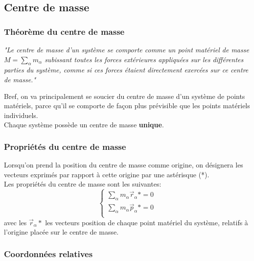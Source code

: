 \documentclass{article}
\numberwithin{equation}{section}
\begin{document}
\subsection{Centre de masse}

\subsubsection{Théorème du centre de masse}
\begin{center}
	\emph{"Le centre de masse d'un système se comporte comme un point matériel de masse \(M = \sum_\alpha m_\alpha\) subissant toutes les forces extérieures appliquées sur les différentes parties du système, comme si ces forces étaient directement exercées sur ce centre de masse."}
\end{center}
Bref, on va principalement se soucier du centre de masse d'un système de points matériels, parce qu'il se comporte de façon plus prévisible que les points matériels individuels. \\
Chaque système possède un centre de masse \textbf{unique}.

\subsubsection{Propriétés du centre de masse}
Lorsqu'on prend la position du centre de masse comme origine, on désignera les vecteurs exprimés par rapport à cette origine par une astérisque (*). \\

Les propriétés du centre de masse sont les suivantes:
\begin{equation}
	\begin{cases}
		\sum_\alpha m_\alpha \vec r_\alpha * = 0 \\
		\sum_\alpha m_\alpha \vec p_\alpha * =0 \\
	\end{cases}
\end{equation} 
avec les \(\vec r_\alpha *\) les vecteurs position de chaque point matériel du système, relatifs à l'origine placée sur le centre de masse.

\subsubsection{Coordonnées relatives}
\end{document}
